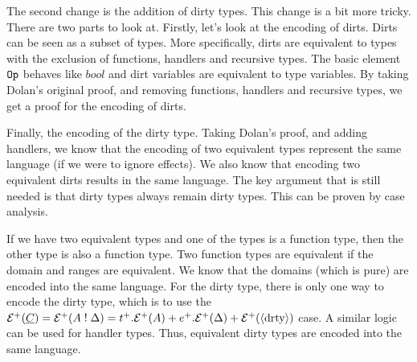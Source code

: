 The second change is the addition of dirty types. This change is a bit more tricky. There are two parts to look at. Firstly, let's look at the encoding of dirts. Dirts can be seen as a subset of types. More specifically, dirts are equivalent to types with the exclusion of functions, handlers and recursive types. The basic element $\mathtt{Op}$ behaves like $bool$ and dirt variables are equivalent to type variables. By taking Dolan's original proof, and removing functions, handlers and recursive types, we get a proof for the encoding of dirts.

Finally, the encoding of the dirty type. Taking Dolan's proof, and adding handlers, we know that the encoding of two equivalent types represent the same language (if we were to ignore effects). We also know that encoding two equivalent dirts results in the same language. The key argument that is still needed is that dirty types always remain dirty types. This can be proven by case analysis.

If we have two equivalent types and one of the types is a function type, then the other type is also a function type. Two function types are equivalent if the domain and ranges are equivalent. We know that the domains (which is pure) are encoded into the same language. For the dirty type, there is only one way to encode the dirty type, which is to use the $\mathcal{E}^+(\underline{C}) = \mathcal{E}^+(A \mathrel{!} \Delta) = t^+ . \mathcal{E}^+(A) + e^+ . \mathcal{E}^+(\Delta) + \mathcal{E}^+(\langle \text{drty} \rangle)$ case. A similar logic can be used for handler types. Thus, equivalent dirty types are encoded into the same language. 

